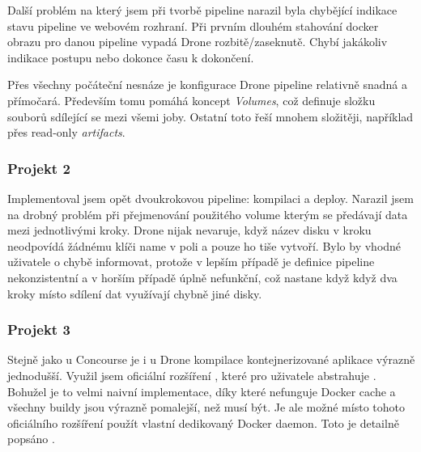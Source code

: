             Další problém na který jsem při tvorbě pipeline narazil byla chybějící indikace stavu pipeline ve webovém rozhraní. Při prvním dlouhém stahování docker obrazu pro danou pipeline vypadá Drone rozbitě/zaseknutě. Chybí jakákoliv indikace postupu nebo dokonce času k dokončení.

            Přes všechny počáteční nesnáze je konfigurace Drone pipeline relativně snadná a přímočará. Především tomu pomáhá koncept \textit{Volumes}, což definuje složku souborů sdílející se mezi všemi joby. Ostatní \CI toto řeší mnohem složitěji, například přes read-only \textit{artifacts}.

        \subsubsection{Projekt 2}
            Implementoval jsem opět dvoukrokovou pipeline: kompilaci a deploy. Narazil jsem na drobný problém při přejmenování použitého volume kterým se předávají data mezi jednotlivými kroky. Drone nijak nevaruje, když název disku v kroku neodpovídá žádnému klíči name v poli  a pouze ho tiše vytvoří. Bylo by vhodné uživatele o chybě informovat, protože v lepším případě je definice pipeline nekonzistentní a v horším případě úplně nefunkční, což nastane když když dva kroky místo sdílení dat využívají chybně jiné disky.

        \subsubsection{Projekt 3}
            Stejně jako u Concourse je i u Drone kompilace kontejnerizované aplikace výrazně jednodušší. Využil jsem oficiální rozšíření , které pro uživatele abstrahuje . Bohužel je to velmi naivní implementace, díky které nefunguje Docker cache a všechny buildy jsou výrazně pomalejší, než musí být. Je ale možné místo tohoto oficiálního rozšíření použít vlastní dedikovaný Docker daemon. Toto je detailně popsáno .
